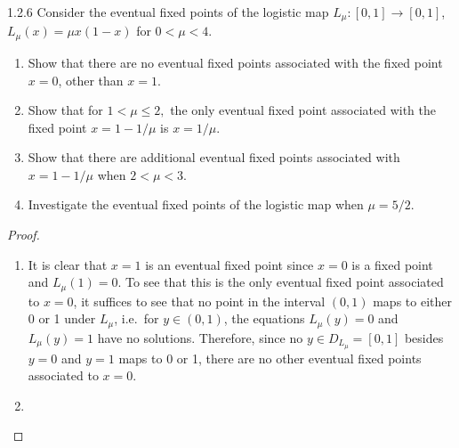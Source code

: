 \begin{problem}{1.2.6}
  Consider the eventual fixed points of the logistic map $L_{\mu}: [0,1] \to [0,1]$,
  $L_\mu(x)  = \mu x (1-x)$ for $0 < \mu < 4$.
  \begin{enumerate}
    \item Show that there are no eventual fixed points associated with the fixed
      point $x=0$, other than $x=1$.
    \item Show that for $1 < \mu \leq 2,$ the only eventual fixed point associated
      with the fixed point $x = 1 - 1/\mu$ is $x = 1/\mu$.
    \item Show that there are additional eventual fixed points associated with $x = 1 - 1/\mu$
      when $2 < \mu < 3$.
    \item Investigate the eventual fixed points of the logistic map when $\mu = 5/2$.
  \end{enumerate}
\end{problem}

\begin{proof}
  \begin{enumerate}
    \item It is clear that $x=1$ is an eventual fixed
      point since $x=0$ is a fixed point and $L_\mu(1) = 0$. To see that this
      is the only eventual fixed point associated to $x=0$, it suffices to see that no point
      in the interval $(0, 1)$ maps to either 0 or 1 under $L_\mu$, i.e.\
      for $y\in(0,1)$, the equations $L_\mu(y) = 0$ and $L_\mu(y) = 1$ have no solutions.
      Therefore, since no $y \in D_L_\mu = [0, 1]$ besides $y=0$ and $y=1$ maps to 0 or 1,
      there are no other eventual fixed points associated to $x=0$.
    \item
  \end{enumerate}
\end{proof}
\newpage
